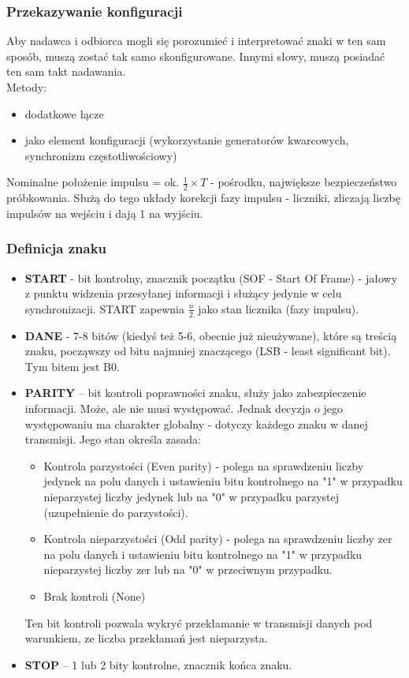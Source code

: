 \documentclass[a4paper,twoside]{article}
\begin{document}
		\subsubsection{Przekazywanie konfiguracji}
			Aby nadawca i odbiorca mogli się porozumieć i interpretować znaki w ten sam sposób, muszą zostać tak samo skonfigurowane. Innymi słowy, muszą posiadać ten sam takt nadawania.\\Metody:\\
			\begin{itemize}
				\item dodatkowe łącze
				\item jako element konfiguracji (wykorzystanie generatorów kwarcowych, synchronizm częstotliwościowy)
			\end{itemize}
			Nominalne położenie impulsu = ok. $\frac{1}{2}\times{T}$ - pośrodku, największe bezpieczeństwo próbkowania. Służą do tego układy korekcji fazy impulsu - liczniki, zliczają liczbę impulsów na wejściu i dają 1 na wyjściu.
		\subsubsection{Definicja znaku}
		\begin{itemize}
			\item \textbf{START} - bit kontrolny, znacznik początku (SOF - Start Of Frame) - jałowy z punktu widzenia przesyłanej informacji i służący jedynie w celu synchronizacji. START zapewnia $\frac{n}{2}$ jako stan licznika (fazy impulsu).
			\item \textbf{DANE} - 7-8 bitów (kiedyś też 5-6, obecnie już nieużywane), które są treścią znaku, począwszy od bitu najmniej znaczącego (LSB - least significant bit). Tym bitem jest B0.
			\item \textbf{PARITY} – bit kontroli poprawności znaku, służy jako zabezpieczenie informacji. Może, ale nie musi występować. Jednak decyzja o jego występowaniu ma charakter globalny - dotyczy każdego znaku w danej transmisji. Jego stan określa zasada:
			\begin{itemize}
				\item Kontrola parzystości (Even parity) - polega na sprawdzeniu liczby jedynek na polu danych i ustawieniu bitu kontrolnego na "1" w przypadku nieparzystej liczby jedynek lub na "0" w przypadku parzystej (uzupełnienie do parzystości).
				\item Kontrola nieparzystości (Odd parity) - polega na sprawdzeniu liczby zer na polu danych i ustawieniu bitu kontrolnego na "1" w przypadku nieparzystej liczby zer lub na "0" w przeciwnym przypadku.
				\item Brak kontroli (None)
			\end{itemize}
			Ten bit kontroli pozwala wykryć przekłamanie w transmisji danych pod warunkiem, ze liczba przekłamań jest nieparzysta.
			\item \textbf{STOP} – 1 lub 2 bity kontrolne, znacznik końca znaku.
		\end{itemize}
\end{document}
